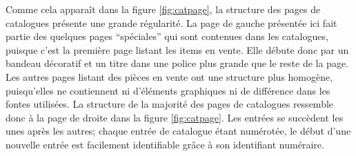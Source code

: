 Comme cela apparaît dans la figure \ref{fig:catpage}, la structure des pages de catalogues présente une grande régularité. La page de gauche présentée ici fait partie des quelques pages \enquote{spéciales} qui sont contenues dans les catalogues, puisque c'est la première page listant les items en vente. Elle débute donc par un bandeau décoratif et un titre dans une police plus grande que le reste de la page. Les autres pages listant des pièces en vente ont une structure plus homogène, puisqu'elles ne contiennent ni d'éléments graphiques ni de différence dans les fontes utilisées. La structure de la majorité des pages de catalogues ressemble donc à la page de droite dans la figure \ref{fig:catpage}. Les entrées se succèdent les unes après les autres; chaque entrée de catalogue étant numérotée, le début d'une nouvelle entrée est facilement identifiable grâce à son identifiant numéraire.

